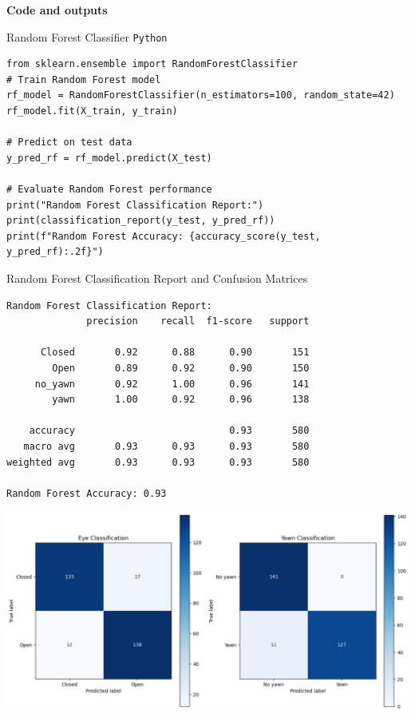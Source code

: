 \documentclass{modeleRapport}
\begin{document}
\bigskip
\textbf{Code and outputs\\}
\begin{codebox}[RF Classifier]{Random Forest Classifier \texttt{Python}}
\begin{lstlisting}
from sklearn.ensemble import RandomForestClassifier
# Train Random Forest model
rf_model = RandomForestClassifier(n_estimators=100, random_state=42)
rf_model.fit(X_train, y_train)

# Predict on test data
y_pred_rf = rf_model.predict(X_test)

# Evaluate Random Forest performance
print("Random Forest Classification Report:")
print(classification_report(y_test, y_pred_rf))
print(f"Random Forest Accuracy: {accuracy_score(y_test, y_pred_rf):.2f}")
\end{lstlisting}
\end{codebox}


\begin{codebox}[OutputD]{ Random Forest Classification Report and Confusion Matrices}
\begin{lstlisting}
Random Forest Classification Report:
              precision    recall  f1-score   support

      Closed       0.92      0.88      0.90       151
        Open       0.89      0.92      0.90       150
     no_yawn       0.92      1.00      0.96       141
        yawn       1.00      0.92      0.96       138

    accuracy                           0.93       580
   macro avg       0.93      0.93      0.93       580
weighted avg       0.93      0.93      0.93       580

Random Forest Accuracy: 0.93
\end{lstlisting}

\includegraphics[width=14cm]{Images/RF_cm.png}

\end{codebox}
\end{document}
